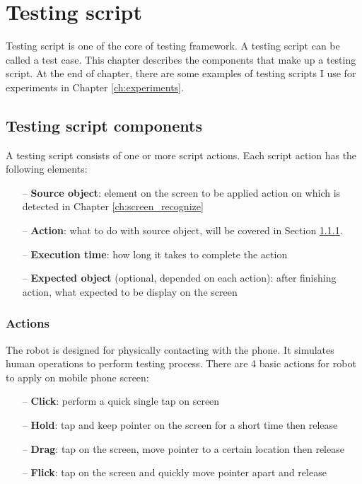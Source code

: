 \chapter{Testing script}
Testing script is one of the core of testing framework.
A testing script can be called a test case.
This chapter describes the components that make up a testing script. At the end of chapter, there are some examples of testing scripts I use for experiments in Chapter \ref{ch:experiments}.

\section{Testing script components}
\label{sec:script_comp}
A testing script consists of one or more script actions. Each script action has the following elements:
    \begin{itemize}
		\item[--] \textbf{Source object}: element on the screen to be applied action on which is detected in Chapter \ref{ch:screen_recognize}
		\item[--] \textbf{Action}: what to do with source object, will be covered in Section \ref{sec:actions}.
		\item[--] \textbf{Execution time}: how long it takes to complete the action
		\item[--] \textbf{Expected object} (optional, depended on each action): after finishing action, what expected to be display on the screen
	\end{itemize}

\subsection{Actions}
\label{sec:actions}
The robot is designed for physically contacting with the phone. It simulates human operations to perform testing process.
There are 4 basic actions for robot to apply on mobile phone screen:
    \begin{itemize}
		\item[--] \textbf{Click}: perform a quick single tap on screen
		\item[--] \textbf{Hold}: tap and keep pointer on the screen for a short time then release
		\item[--] \textbf{Drag}: tap on the screen, move pointer to a certain location then release
		\item[--] \textbf{Flick}: tap on the screen and quickly move pointer apart and release
	\end{itemize}


